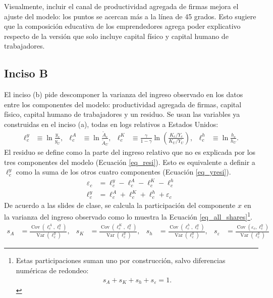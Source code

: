 Visualmente, incluir el canal de productividad agregada de firmas mejora el ajuste del modelo: los puntos se acercan más a la línea de 45 grados. Esto sugiere que la composición educativa de los emprendedores agrega poder explicativo respecto de la versión que solo incluye capital físico y capital humano de trabajadores.

\subsection{Inciso B}

El inciso (b) pide descomponer la varianza del ingreso observado en los datos entre los componentes del modelo: productividad agregada de firmas, capital físico, capital humano de trabajadores y un residuo. Se usan las variables ya construidas en el inciso (a), todas en logs relativos a Estados Unidos:
\begin{align}
	\ell^y_c &\equiv \ln\frac{y_c}{y_U}, &
	\ell^A_c &\equiv \ln\frac{\tilde A_c}{\tilde A_U}, &
	\ell^K_c &\equiv \frac{\gamma}{1-\gamma}
	\ln\left(
	\frac{K_c/Y_c}{K_U/Y_U}
	\right), &
	\ell^h_c &\equiv \ln\frac{h_c}{h_U}.
\end{align}
El residuo se define como la parte del ingreso relativo que no es explicada por los tres componentes del modelo (Ecuación \ref{eq_resi}). Esto es equivalente a definir a $\ell^y_c$ como la suma de los otros cuatro componentes (Ecuación \ref{eq_yresi}).
\begin{align}
	\varepsilon_c
	&=
	\ell^y_c
	-
	\ell^A_c
	-
	\ell^K_c
	-
	\ell^h_c \label{eq_resi} \\
	\ell^y_c
	&=
	\ell^A_c
	+
	\ell^K_c
	+
	\ell^h_c
	+
	\varepsilon_c \label{eq_yresi}
\end{align}
De acuerdo a las slides de clase, se calcula la participación del componente $x$ en la varianza del ingreso observado como lo muestra la Ecuación \ref{eq_all_shares}\footnote{
	Estas participaciones suman uno por construcción, salvo diferencias numéricas de redondeo:
	\begin{align}
		s_A + s_K + s_h + s_\varepsilon = 1.
	\end{align}
}.
\begin{align}
	s_A &=
	\frac{\operatorname{Cov}(\ell^A_c,\ell^y_c)}
	{\operatorname{Var}(\ell^y_c)}, &
	s_K &=
	\frac{\operatorname{Cov}(\ell^K_c,\ell^y_c)}
	{\operatorname{Var}(\ell^y_c)}, &
	s_h &=
	\frac{\operatorname{Cov}(\ell^h_c,\ell^y_c)}
	{\operatorname{Var}(\ell^y_c)}, &
	s_\varepsilon &=
	\frac{\operatorname{Cov}(\varepsilon_c,\ell^y_c)}
	{\operatorname{Var}(\ell^y_c)} \label{eq_all_shares}
\end{align}

